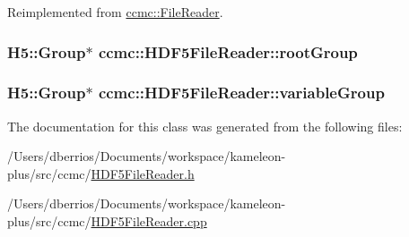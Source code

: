Reimplemented from \hyperlink{classccmc_1_1_file_reader_a2afb0635bf14f222991efc4d63e5f17a}{ccmc::FileReader}.

\hypertarget{classccmc_1_1_h_d_f5_file_reader_ab625127a9cb1f09262ba79874c4479ba}{
\subsubsection[{rootGroup}]{\setlength{\rightskip}{0pt plus 5cm}H5::Group$\ast$ {\bf ccmc::HDF5FileReader::rootGroup}}}
\label{classccmc_1_1_h_d_f5_file_reader_ab625127a9cb1f09262ba79874c4479ba}
\hypertarget{classccmc_1_1_h_d_f5_file_reader_a8030944befcec51a0cca62bacee4ac47}{
\subsubsection[{variableGroup}]{\setlength{\rightskip}{0pt plus 5cm}H5::Group$\ast$ {\bf ccmc::HDF5FileReader::variableGroup}}}
\label{classccmc_1_1_h_d_f5_file_reader_a8030944befcec51a0cca62bacee4ac47}


The documentation for this class was generated from the following files:\begin{DoxyCompactItemize}
\item 
/Users/dberrios/Documents/workspace/kameleon-\/plus/src/ccmc/\hyperlink{_h_d_f5_file_reader_8h}{HDF5FileReader.h}\item 
/Users/dberrios/Documents/workspace/kameleon-\/plus/src/ccmc/\hyperlink{_h_d_f5_file_reader_8cpp}{HDF5FileReader.cpp}\end{DoxyCompactItemize}
